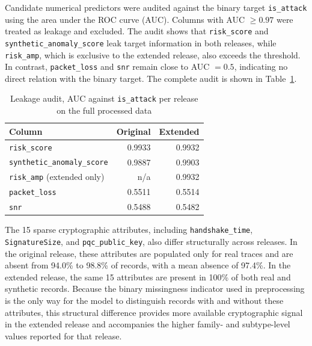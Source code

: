 \documentclass{IEEEoj}
\begin{document}
Candidate numerical predictors were audited against the binary target \texttt{is\_attack} using the area under the ROC curve (AUC). Columns with AUC $\geq 0.97$ were treated as leakage and excluded. The audit shows that \texttt{risk\_score} and \texttt{synthetic\_anomaly\_score} leak target information in both releases, while \texttt{risk\_amp}, which is exclusive to the extended release, also exceeds the threshold. In contrast, \texttt{packet\_loss} and \texttt{snr} remain close to AUC $=0.5$, indicating no direct relation with the binary target. The complete audit is shown in Table~\ref{tab:leakage_audit}.

\begin{table}[!t]
\caption{Leakage audit, AUC against \texttt{is\_attack} per release on the full processed data}
\label{tab:leakage_audit}
\centering
\small
\begin{tabular}{lrr}
\toprule
Column & Original & Extended \\
\midrule
\texttt{risk\_score} & 0.9933 & 0.9932 \\
\texttt{synthetic\_anomaly\_score} & 0.9887 & 0.9903 \\
\texttt{risk\_amp} (extended only) & n/a & 0.9932 \\
\midrule
\texttt{packet\_loss} & 0.5511 & 0.5514 \\
\texttt{snr} & 0.5488 & 0.5482 \\
\bottomrule
\end{tabular}
\end{table}

The 15 sparse cryptographic attributes, including \texttt{handshake\_time},
\texttt{SignatureSize}, and \texttt{pqc\_public\_key}, also differ structurally
across releases. In the original release, these attributes are populated only
for real traces and are absent from 94.0\% to 98.8\% of records, with a mean
absence of 97.4\%. In the extended release, the same 15 attributes are present
in 100\% of both real and synthetic records. Because the binary missingness
indicator used in preprocessing is the only way for the model to distinguish
records with and without these attributes, this structural difference provides
 more available cryptographic signal in the extended release and accompanies
 the higher family- and subtype-level values reported for that release.
\end{document}
